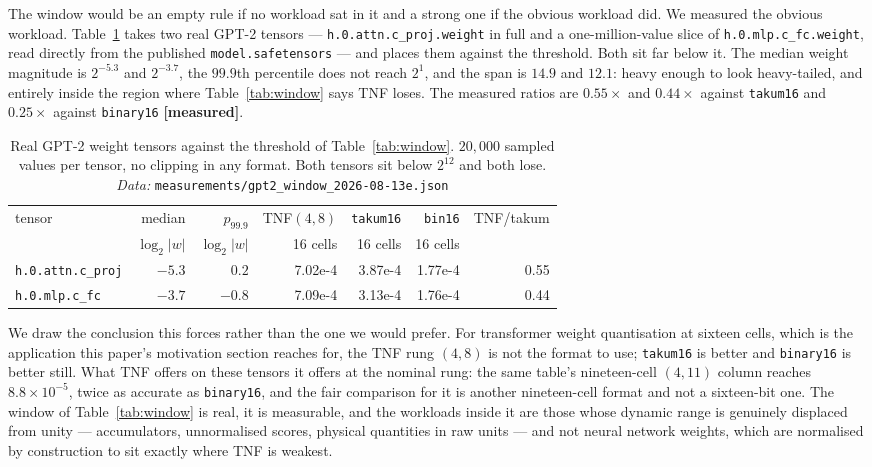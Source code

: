 \documentclass[11pt]{article}
\theoremstyle{definition}
\begin{document}
The window would be an empty rule if no workload sat in it and a strong one if the
obvious workload did. We measured the obvious workload. Table~\ref{tab:gpt2window}
takes two real GPT-2 tensors --- \texttt{h.0.attn.c\_proj.weight} in full and a
one-million-value slice of \texttt{h.0.mlp.c\_fc.weight}, read directly from the
published \texttt{model.safetensors} --- and places them against the threshold.
Both sit far below it. The median weight magnitude is $2^{-5.3}$ and $2^{-3.7}$, the
$99.9$th percentile does not reach $2^{1}$, and the span is $14.9$ and $12.1$: heavy
enough to look heavy-tailed, and entirely inside the region where
Table~\ref{tab:window} says TNF loses. The measured ratios are $0.55\times$ and
$0.44\times$ against \texttt{takum16} and $0.25\times$ against \texttt{binary16}
\textbf{[measured]}.

\begin{table}[htbp]\centering\small
\caption{Real GPT-2 weight tensors against the threshold of
Table~\ref{tab:window}. $20{,}000$ sampled values per tensor, no clipping in any
format. Both tensors sit below $2^{12}$ and both lose. \emph{Data:} \texttt{measurements/gpt2\_window\_2026-08-13e.json}}
\label{tab:gpt2window}
\begin{tabular}{lrrrrrr}
\hline
tensor & median & $p_{99.9}$ & TNF$(4,8)$ & \texttt{takum16} & \texttt{bin16} & TNF/takum \\
 & $\log_2|w|$ & $\log_2|w|$ & 16 cells & 16 cells & 16 cells & \\
\hline
\texttt{h.0.attn.c\_proj} & $-5.3$ & $0.2$ & 7.02e-4 & 3.87e-4 & 1.77e-4 & 0.55 \\
\texttt{h.0.mlp.c\_fc} & $-3.7$ & $-0.8$ & 7.09e-4 & 3.13e-4 & 1.76e-4 & 0.44 \\
\hline
\end{tabular}
\end{table}

We draw the conclusion this forces rather than the one we would prefer. For
transformer weight quantisation at sixteen cells, which is the application this
paper's motivation section reaches for, the TNF rung $(4,8)$ is not the format to
use; \texttt{takum16} is better and \texttt{binary16} is better still. What TNF
offers on these tensors it offers at the nominal rung: the same table's nineteen-cell
$(4,11)$ column reaches $8.8\times 10^{-5}$, twice as accurate as
\texttt{binary16}, and the fair comparison for it is another nineteen-cell format
and not a sixteen-bit one. The window of Table~\ref{tab:window} is real, it is
measurable, and the workloads inside it are those whose dynamic range is genuinely
displaced from unity --- accumulators, unnormalised scores, physical quantities in
raw units --- and not neural network weights, which are normalised by construction
to sit exactly where TNF is weakest.
\end{document}

